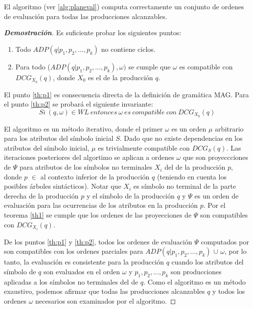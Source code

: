 \begin{theorem}
\label{th2}
El algoritmo  (ver \ref{alg:planeval}) computa correctamente un conjunto de ordenes de evaluación para todas las producciones alcanzables.
\end{theorem}

\begin{proof}[\textbf{Demostración}]
Es suficiente probar los siguientes puntos:
\begin{enumerate}
    \item \label{th:p1}Todo $ADP (q | p_{1}, p_{2}, \dots, p_{k})$ no contiene ciclos.

    \item \label{th:p2}Para todo ($ADP (q | p_{1}, p_{2}, \dots, p_{k}), \omega)$ se cumple que $\omega$ es compatible con $DCG_{X_{0}}(q)$,  donde $X_{0}$ es el  de la producción $q$.
\end{enumerate}

El punto \ref{th:p1} es consecuencia directa de la definición de gramática MAG. Para el punto \ref{th:p2} se probará el siguiente invariante:
$$
Si\ (q,\omega)\in WL\ entonces\ \omega\ es\ compatible\ con\ DCG_{X_{0}}(q)
$$

El algoritmo  es un método iterativo, donde el primer $\omega$ es un orden $\mu$ arbitrario para los atributos del símbolo inicial $S$. Dado que no existe dependencias en los atributos del símbolo inicial, $\mu$ es trivialmente compatible con $DCG_{S}(q)$. Las iteraciones posteriores del algortimo  se aplican a ordenes $\omega$ que son proyeccciones de $\Psi$ para atributos de los símbolos no terminales $X_{i}$ del  de la producción $p$, donde $p$ $\in$ al contexto inferior de la producción $q$ (teniendo en cuenta los posibles árboles sintácticos). Notar que $X_{i}$ es símbolo no terminal de la parte derecha de la producción $p$ y el símbolo  de la producción $q$ y $\Psi$ es un orden de evaluación para las ocurrencias de los atributos en la producción $p$. Por el teorema \ref{th1} se cumple que los ordenes de las proyecciones de $\Psi$ son compatibles con $DCG_{X_{i}}(q)$.

De los puntos \ref{th:p1} y \ref{th:p2}, todos los ordenes de evaluación $\Psi$ computados por  son compatibles con los ordenes parciales para $ADP (q | p_{1}, p_{2}, \dots, p_{k})$ $\cup$ $\omega$, por lo tanto, la evaluación es consistente para la producción $q$ cuando los atributos del símbolo  de $q$ son evaluados en el orden $\omega$ y $p_{1}, p_{2}, \dots, p_{k}$ son producciones aplicadas a los símbolos no terminales del  de $q$. Como el algoritmo es un método exaustivo, podemos afirmar que todas las producciones alcanzables $q$ y todos los ordenes $\omega$ necesarios son examinados por el algoritmo.

\end{proof}

